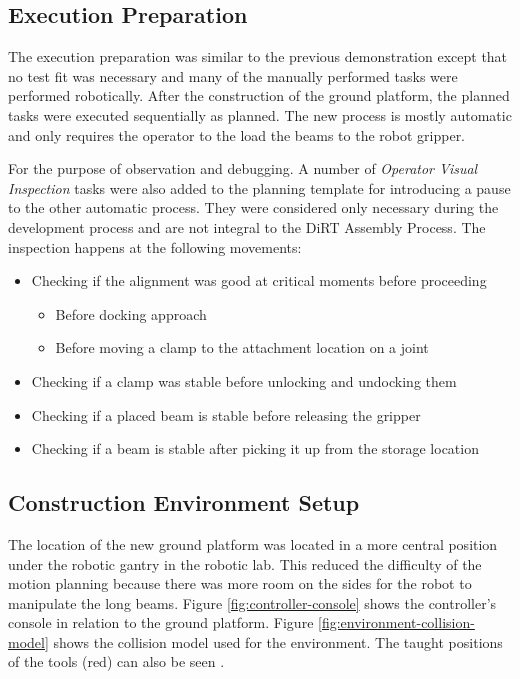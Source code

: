 \subsection{Execution Preparation}
\label{subsection:exploration-3-execution-plan}

The execution preparation was similar to the previous demonstration except that no test fit was necessary and many of the manually performed tasks were performed robotically. After the construction of the ground platform, the planned tasks were executed sequentially as planned. The new process is mostly automatic and only requires the operator to the load the beams to the robot gripper. 

For the purpose of observation and debugging. A number of \textit{Operator Visual Inspection} tasks were also added to the planning template for introducing a pause to the other automatic process. They were considered only necessary during the development process and are not integral to the DiRT Assembly Process. The inspection happens at the following movements:

\begin{itemize}
	\item Checking if the alignment was good at critical moments before proceeding
    \begin{itemize}
        \item Before docking approach
        \item Before moving a clamp to the attachment location on a joint
    \end{itemize}

	\item Checking if a clamp was stable before unlocking and undocking them
	\item Checking if a placed beam is stable before releasing the gripper
	\item Checking if a beam is stable after picking it up from the storage location
\end{itemize}

\subsection{Construction Environment Setup}
\label{subsection:exploration-3-construction-environment-setup}

The location of the new ground platform  was located in a more central position under the robotic gantry in the robotic lab. This reduced the difficulty of the motion planning because there was more room on the sides for the robot to manipulate the long beams. Figure \ref{fig:controller-console} shows the controller’s console in relation to the ground platform.
Figure \ref{fig:environment-collision-model} shows the collision model used for the environment. The taught positions of the tools (red) can also be seen .


